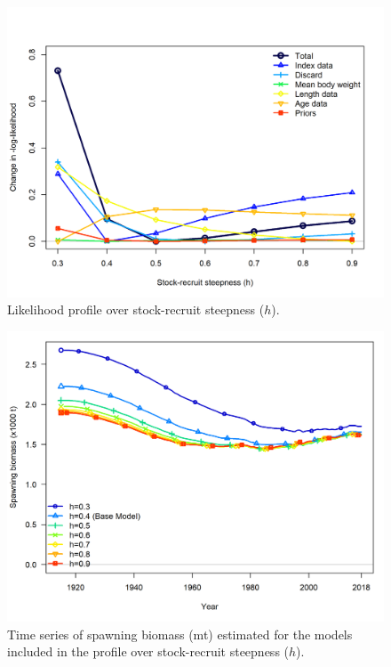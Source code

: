 \documentclass[12pt,]{article}
\begin{document}
\FloatBarrier

\begin{figure}
\centering
\includegraphics{Figures/profile_h.png}
\caption{Likelihood profile over stock-recruit steepness (\(h\)).
\label{fig:profile_h}}
\end{figure}

\begin{figure}
\centering
\includegraphics{Figures/profile_h_compare1_spawnbio.png}
\caption{Time series of spawning biomass (mt) estimated for the models
included in the profile over stock-recruit steepness (\(h\)).
\label{fig:profile_h_compare1_spawnbio}}
\end{figure}
\end{document}
